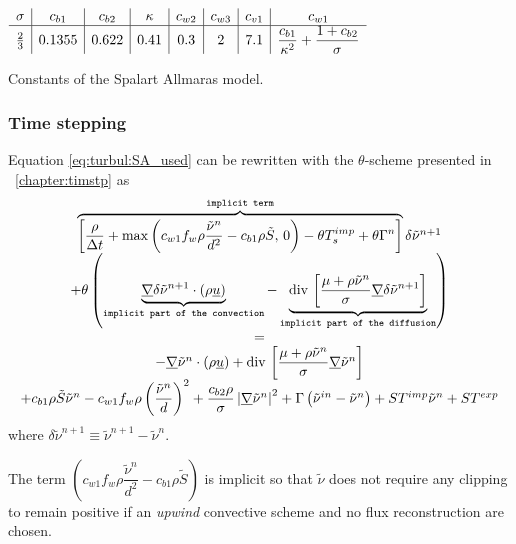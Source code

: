 \begin{table}[!htbp]
\centering
$
\begin{array}{c | c | c | c | c | c | c | c }
\sigma      & c_{b1} & c_{b2} & \kappa & c_{w2} & c_{w3} & c_{v1} & c_{w1} \\
\hline
\frac{2}{3} & 0.1355 & 0.622  & 0.41   & 0.3    & 2      & 7.1    & \dfrac{c_{b1}}{ \kappa^2}+ \dfrac{1+c_{b2}}{ \sigma}
\end{array}
$
\caption{Constants of the Spalart Allmaras model.\label{tab:const_SA}}
\end{table}

\subsubsection{Time stepping}

Equation \eqref{eq:turbul:SA_used} can be rewritten with the $\theta$-scheme presented in \chaptername~\ref{chapter:timstp} as
%
\begin{equation}\label{eq:turbul:SA_time}
\begin{array}{c}
\overbrace{
\left[ \dfrac{\rho}{\Delta t} + \max \left( c_{w1} f_{w} \rho  \dfrac{\tilde{\nu}^n}{d^2} - c_{b1}\rho \tilde{S} , \, 0 \right) - \theta T_s^{imp} + \theta \Gamma^n \right]
}^{\texttt{implicit term}}
\delta \tilde{\nu}^{n+1}
%
\\
+ \theta
\left(
\underbrace{
 \grad \delta \tilde{\nu}^{n+1} \cdot \left( \rho \vect{u} \right)
}_{
\texttt{implicit part of the convection}
}
-
\underbrace{
\divs \left[ \dfrac{\mu + \rho \tilde{\nu}^{n}}{\sigma} \grad \delta \tilde{\nu}^{n+1} \right]
}_{
\texttt{implicit part of the diffusion}
}
\right)
\\
=
\\
- \grad \tilde{\nu}^{n} \cdot \left( \rho \vect{u} \right)
+
\divs \left[ \dfrac{\mu + \rho \tilde{\nu}^{n}}{\sigma} \grad \tilde{\nu}^{n} \right]
\\
+
c_{b1} \rho \tilde{S} \tilde{\nu}^n
- c_{w1}f_{w}\rho \left( \dfrac{\tilde{\nu}^{n}}{d} \right)^2
+ \dfrac{c_{b2}\rho}{ \sigma}
 \left| \grad \tilde{\nu}^{n} \right| ^2
 + \Gamma \left( \tilde{\nu}^{in} - \tilde{\nu}^n \right) +ST^{imp} \tilde{\nu}^n +ST^{exp}
\end{array}
\end{equation}
where $\delta \tilde{\nu}^{n+1} \equiv \tilde{\nu}^{n+1} - \tilde{\nu}^{n}$.

\begin{remark}
The term $\left( c_{w1} f_{w} \rho  \dfrac{\tilde{\nu}^n}{d^2} - c_{b1}\rho \tilde{S} \right)$ is implicit
so that $\tilde{\nu} $ does not require any clipping to remain positive if an \emph{upwind} convective scheme and no flux
reconstruction are chosen.
\end{remark}


